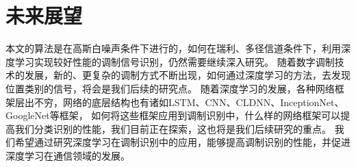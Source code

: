 \section{未来展望}
本文的算法是在高斯白噪声条件下进行的，如何在瑞利、多径信道条件下，利用深度学习实现较好性能的调制信号识别，仍然需要继续深入研究。
随着数字调制技术的发展，新的、更复杂的调制方式不断出现，如何通过深度学习的方法，去发现位置类别的信号，将会是我们后续的研究点。 
随着深度学习的发展，各种网络框架层出不穷，网络的底层结构也有诸如LSTM、CNN、CLDNN、InceptionNet、GoogleNet等框架，
如何将这些框架应用到调制识别中，什么样的网络框架可以提高我们分类识别的性能，我们目前正在探索，这也将是我们后续研究的重点。
我们希望通过研究深度学习在调制识别中的应用，能够提高调制识别的性能，并促进深度学习在通信领域的发展。\par